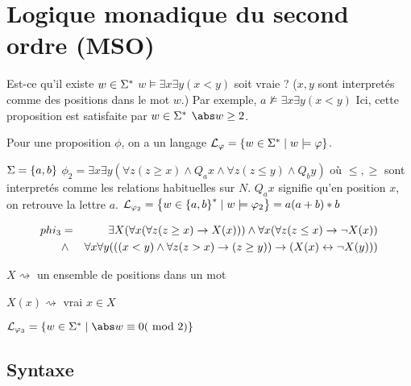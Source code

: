 \section{Logique monadique du second ordre (MSO)}

Est-ce qu'il existe $w \in \Sigma^{*}$ \tq $w {\models} \exists x \exists y (x < y)$ soit vraie ?
($x,y$ sont interpretés comme des positions dans le mot $w$.)
Par exemple, $a {\nvDash} \exists x \exists y (x < y)$
Ici, cette proposition est satisfaite par $w \in \Sigma^{*}$ \ssi $\abs w \geq 2$.


Pour une proposition $\phi$, on a un langage $\mathcal{L}_\varphi = \left\{w \in \Sigma^{*} \mid w \models \varphi\right\}$.


\begin{exemple}
	$\Sigma = \left\{a,b\right\}$
	$\phi_2 = \exists x \exists y (\forall z (z \geq x) \land Q_a x \land \forall z (z \leq y) \land Q_b y)$
	où $\leq, \geq$ sont interpretés comme les relations habituelles sur $N$.
	$Q_a x$ signifie qu'en position $x$, on retrouve la lettre $a$.
	$\mathcal{L}_{\varphi_2} = \left\{w \in \left\{a,b\right\}^{*} \mid w \models \varphi_2\right\} = a(a+b)*b$
\end{exemple}


\begin{exemple}

	\begin{eqnarray*}
		phi_3 &=& \exists X (\forall x (\forall z (z \geq x) \rightarrow X(x))) \land \forall x (\forall z (z \leq x) \rightarrow \lnot X(x)) \\
		&\land& \forall x \forall y (((x < y) \land \forall z(z > x) \rightarrow (z \geq y)) \rightarrow (X (x) \leftrightarrow \lnot X(y)))
	\end{eqnarray*}



	$X \rightsquigarrow $ un ensemble de positions dans un mot


	$X (x)\rightsquigarrow$ vrai \ssi $x \in X$


	$\La_{\phi_3} = \setdef {w \in \mots} {\abs w \equiv 0 (\text { mod } 2)}$
\end{exemple}

\subsection{Syntaxe}

